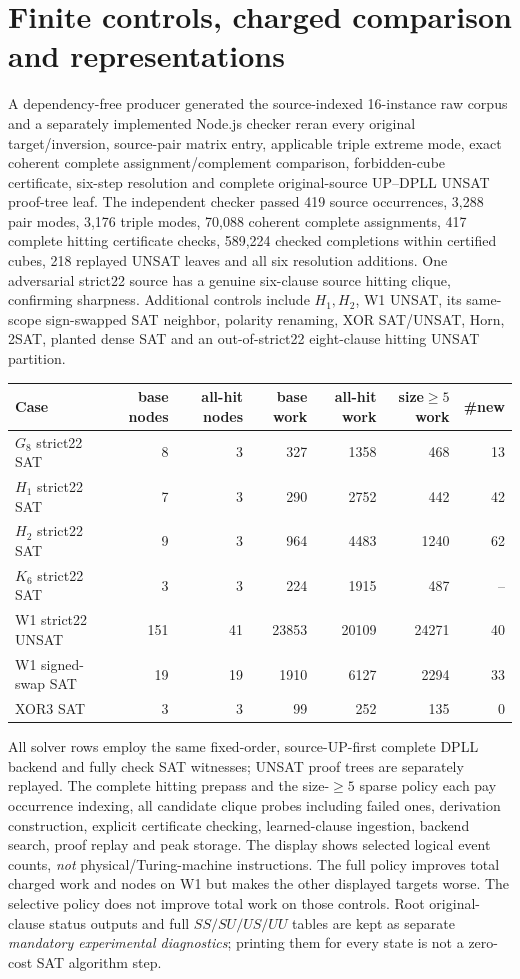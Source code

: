 \documentclass[10pt]{article}
\begin{document}
\section{Finite controls, charged comparison and representations}
A dependency-free producer generated the source-indexed 16-instance raw corpus and a separately implemented Node.js checker reran every original target/inversion, source-pair matrix entry, applicable triple extreme mode, exact coherent complete assignment/complement comparison, forbidden-cube certificate, six-step resolution and complete original-source UP--DPLL UNSAT proof-tree leaf. The independent checker passed 419 source occurrences, 3,288 pair modes, 3,176 triple modes, 70,088 coherent complete assignments, 417 complete hitting certificate checks, 589,224 checked completions within certified cubes, 218 replayed UNSAT leaves and all six resolution additions. One adversarial strict22 source has a genuine six-clause source hitting clique, confirming sharpness. Additional controls include $H_1,H_2$, W1 UNSAT, its same-scope sign-swapped SAT neighbor, polarity renaming, XOR SAT/UNSAT, Horn, 2SAT, planted dense SAT and an out-of-strict22 eight-clause hitting UNSAT partition.

\begin{center}\begin{tabular}{lrrrrrr}
\toprule
Case & base nodes & all-hit nodes & base work & all-hit work & size$\ge5$ work & \#new \\
\midrule
$G_8$ strict22 SAT &8&3&327&1358&468&13\\
$H_1$ strict22 SAT &7&3&290&2752&442&42\\
$H_2$ strict22 SAT &9&3&964&4483&1240&62\\
$K_6$ strict22 SAT &3&3&224&1915&487&--\\
W1 strict22 UNSAT &151&41&23853&20109&24271&40\\
W1 signed-swap SAT &19&19&1910&6127&2294&33\\
XOR3 SAT &3&3&99&252&135&0\\
\bottomrule
\end{tabular}\end{center}
\noindent All solver rows employ the same fixed-order, source-UP-first complete DPLL backend and fully check SAT witnesses; UNSAT proof trees are separately replayed. The complete hitting prepass and the size-$\ge5$ sparse policy each pay occurrence indexing, all candidate clique probes including failed ones, derivation construction, explicit certificate checking, learned-clause ingestion, backend search, proof replay and peak storage. The display shows selected logical event counts, \emph{not} physical/Turing-machine instructions. The full policy improves total charged work and nodes on W1 but makes the other displayed targets worse. The selective policy does not improve total work on those controls. Root original-clause status outputs and full $SS/SU/US/UU$ tables are kept as separate \emph{mandatory experimental diagnostics}; printing them for every state is not a zero-cost SAT algorithm step.
\end{document}
